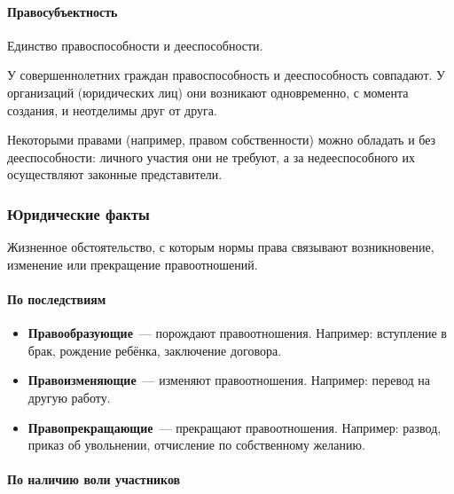 \documentclass[12pt]{article}
\begin{document}
	\paragraph{Правосубъектность}
	
	\begin{definition}[Правосубъектность]
		Единство правоспособности и дееспособности.
	\end{definition}
	
	\begin{note}
		У совершеннолетних граждан правоспособность и дееспособность совпадают. У организаций (юридических лиц) они возникают одновременно, с момента создания, и неотделимы друг от друга.
		
		Некоторыми правами (например, правом собственности) можно обладать и без дееспособности: личного участия они не требуют, а за недееспособного их осуществляют законные представители.
	\end{note}
	
	\subsubsection{Юридические факты}
	
	\begin{definition}
		Жизненное обстоятельство, с которым нормы права связывают возникновение, изменение или прекращение правоотношений.
	\end{definition}
	
	\paragraph{По последствиям}
	
	\begin{itemize}
		\item \textbf{Правообразующие}~--- порождают правоотношения. Например: вступление в брак, рождение ребёнка, заключение договора.
		\item \textbf{Правоизменяющие}~--- изменяют правоотношения. Например: перевод на другую работу.
		\item \textbf{Правопрекращающие}~--- прекращают правоотношения. Например: развод, приказ об увольнении, отчисление по собственному желанию.
	\end{itemize}
	
	\paragraph{По наличию воли участников}
	
\end{document}
